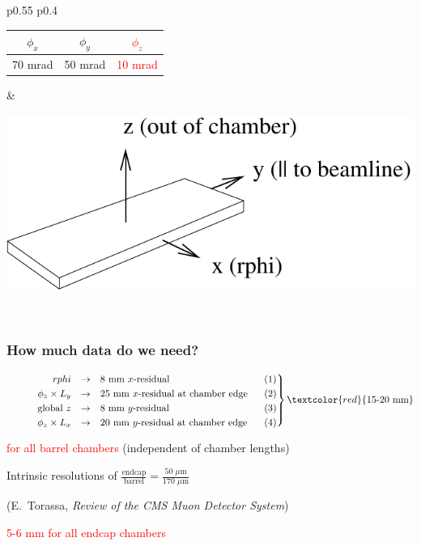 \documentclass[compress]{beamer}
\begin{document}
\begin{frame}
\begin{tabular}{p{0.55\linewidth} p{0.4\linewidth}}
\begin{minipage}{\linewidth}
    \begin{center}
      \begin{tabular}{c c c}
	$\phi_x$ & $\phi_y$ & \textcolor{red}{$\phi_z$} \\\hline
	70 mrad & 50 mrad & \textcolor{red}{10 mrad}
      \end{tabular}
    \end{center}
  \end{minipage} &
  \begin{minipage}{\linewidth}
    \begin{center}
      \includegraphics[height=2 cm]{coordinates}
    \end{center}
  \end{minipage} \\
\end{tabular}
\end{frame}

\begin{frame}
\frametitle{How much data do we need?}

$\left.
\mbox{\begin{minipage}{0.8\linewidth}
\vspace{-\baselineskip}
\begin{eqnarray*}
  rphi &\to& \mbox{8 mm $x$-residual} \\
  \phi_z \times L_y &\to& \mbox{25 mm $x$-residual at chamber edge} \\
  \mbox{global } z &\to& \mbox{8 mm $y$-residual} \\
  \phi_z \times L_x &\to& \mbox{20 mm $y$-residual at chamber edge}
\end{eqnarray*}
\end{minipage}}
\right\} \textcolor{red}{\mbox{15-20 mm}}$

\vspace{0.35 cm}
\textcolor{red}{for all barrel chambers} (independent of chamber lengths)

\vfill
Intrinsic resolutions of $\displaystyle \frac{\mbox{endcap}}{\mbox{barrel}} = \frac{\mbox{50 $\mu$m}}{\mbox{170 $\mu$m}}$
\hfill \begin{minipage}{3 cm}
\small (E.\ Torassa, {\it Review of the CMS Muon Detector System})
\end{minipage}

\vfill
\textcolor{red}{5-6 mm for all endcap chambers}

\end{frame}
\end{document}
